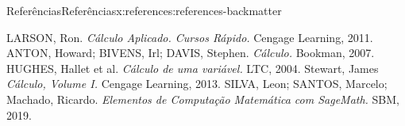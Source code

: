 \documentclass[oneside,10pt,]{article}
\numberwithin{equation}{section}
\begin{document}
%
%
\typeout{************************************************}
\typeout{************************************************}
%
\begin{references-section}{Referências}{}{Referências}{}{}{x:references:references-backmatter}
\begin{referencelist}
\hypertarget{x:biblio:biblio-01}{}LARSON, Ron. \textit{Cálculo Aplicado. Cursos Rápido.} Cengage Learning, 2011.
\hypertarget{x:biblio:biblio-02}{}ANTON, Howard; BIVENS, Irl; DAVIS, Stephen. \textit{Cálculo.} Bookman, 2007.
\hypertarget{x:biblio:biblio-03}{}HUGHES, Hallet et al. \textit{Cálculo de uma variável.} LTC, 2004.
\hypertarget{x:biblio:biblio-04}{}Stewart, James \textit{Cálculo, Volume I.} Cengage Learning, 2013.
\hypertarget{x:biblio:biblio-05}{}SILVA, Leon; SANTOS, Marcelo; Machado, Ricardo. \textit{Elementos de Computação Matemática com SageMath.} SBM, 2019.
\end{referencelist}
\end{references-section}
\end{document}
